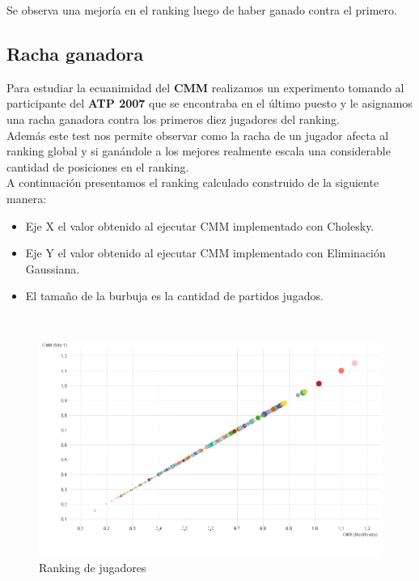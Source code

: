 Se observa una mejoría en el ranking luego de haber ganado contra el primero.
\\

\subsection{Racha ganadora}

Para estudiar la ecuanimidad del \textbf{CMM} realizamos un experimento tomando al participante del \textbf{ATP 2007} que se encontraba en el último puesto y le asignamos una racha ganadora contra los primeros diez jugadores del ranking. \\

Además este test nos permite observar como la racha de un jugador afecta al ranking global y si ganándole a los mejores realmente escala una considerable cantidad de posiciones en el ranking. \\

A continuación presentamos el ranking calculado construido de la siguiente manera: \\

\begin{itemize}
    \item Eje X el valor obtenido al ejecutar CMM implementado con Cholesky.
    \item Eje Y el valor obtenido al ejecutar CMM implementado con Eliminación Gaussiana.
    \item El tamaño de la burbuja es la cantidad de partidos jugados.
\end{itemize}

\\

\begin{figure}[H]
    \centering
    \includegraphics[width=1\textwidth]{IMG/comparativa cmm -cmm foto 0.png}
    \caption{Ranking de jugadores}
    \label{fig:Ranking de jugadores}
\end{figure}

